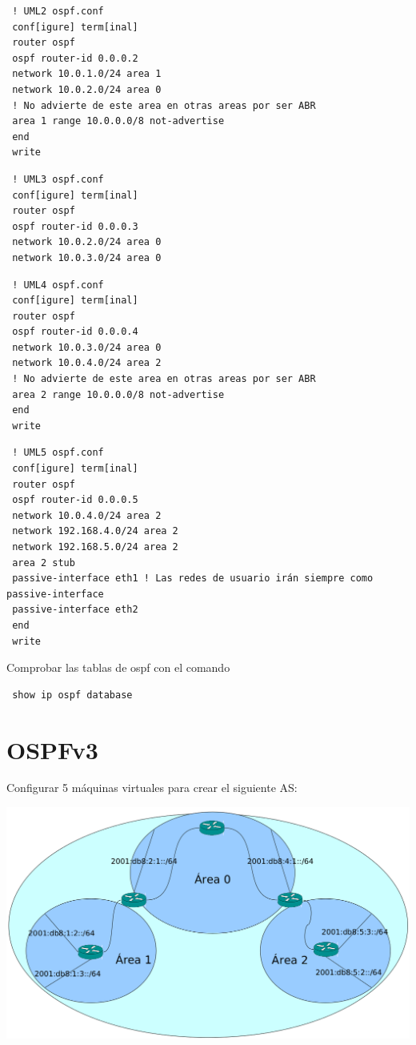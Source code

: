 \documentclass{article}
\begin{document}
\begin{verbatim}
 ! UML2 ospf.conf
 conf[igure] term[inal]
 router ospf
 ospf router-id 0.0.0.2
 network 10.0.1.0/24 area 1
 network 10.0.2.0/24 area 0
 ! No advierte de este area en otras areas por ser ABR
 area 1 range 10.0.0.0/8 not-advertise 
 end
 write
\end{verbatim}

\begin{verbatim}
 ! UML3 ospf.conf
 conf[igure] term[inal]
 router ospf
 ospf router-id 0.0.0.3
 network 10.0.2.0/24 area 0
 network 10.0.3.0/24 area 0

\end{verbatim}

\begin{verbatim}
 ! UML4 ospf.conf
 conf[igure] term[inal]
 router ospf
 ospf router-id 0.0.0.4
 network 10.0.3.0/24 area 0
 network 10.0.4.0/24 area 2
 ! No advierte de este area en otras areas por ser ABR
 area 2 range 10.0.0.0/8 not-advertise
 end
 write
\end{verbatim}

\begin{verbatim}
 ! UML5 ospf.conf
 conf[igure] term[inal]
 router ospf
 ospf router-id 0.0.0.5
 network 10.0.4.0/24 area 2
 network 192.168.4.0/24 area 2
 network 192.168.5.0/24 area 2
 area 2 stub
 passive-interface eth1 ! Las redes de usuario irán siempre como passive-interface
 passive-interface eth2
 end
 write
\end{verbatim}

Comprobar las tablas de ospf con el comando

\begin{verbatim}
 show ip ospf database
\end{verbatim}

\newpage
\section{OSPFv3}
Configurar 5 máquinas virtuales para crear el siguiente AS:

\includegraphics[width=\textwidth]{ospfv3}
\end{document}

